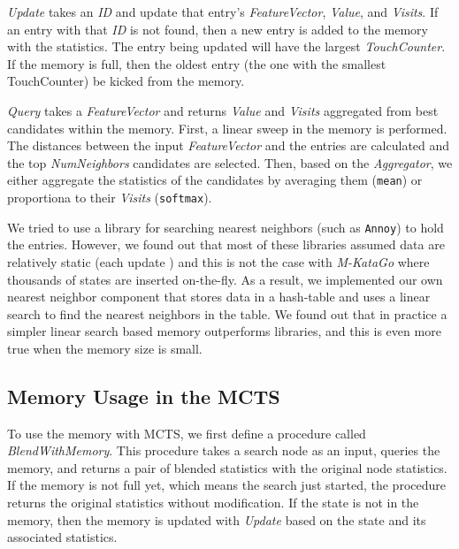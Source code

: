 \documentclass{article}
\newcommand{\mkatago}{\emph{M-KataGo}\xspace}
\begin{document}
      \textit{Update} takes an \textit{ID} and update that entry's \textit{FeatureVector}, \textit{Value}, and \textit{Visits}.
      If an entry with that \textit{ID} is not found, then a new entry is added to the memory with the statistics.
      The entry being updated will have the largest \textit{TouchCounter}.
      If the memory is full, then the oldest entry (the one with the smallest TouchCounter) be kicked from the memory.

      \textit{Query} takes a \textit{FeatureVector} and returns \textit{Value} and \textit{Visits} aggregated from best candidates within the memory.
      First, a linear sweep in the memory is performed.
      The distances between the input \textit{FeatureVector} and the entries are calculated and the top \textit{NumNeighbors} candidates are selected.
      Then, based on the \textit{Aggregator}, we either aggregate the statistics of the candidates by averaging them (\texttt{mean}) or proportiona to their \textit{Visits} (\texttt{softmax}).

      We tried to use a library for searching nearest neighbors (such as \texttt{Annoy}) to hold the entries.
      However, we found out that most of these libraries assumed data are relatively static (each update ) and this is not the case with \mkatago where thousands of states are inserted on-the-fly.
      As a result, we implemented our own nearest neighbor component that stores data in a hash-table and uses a linear search to find the nearest neighbors in the table.
      We found out that in practice a simpler linear search based memory outperforms libraries, and this is even more true when the memory size is small.

      \subsection{Memory Usage in the MCTS}
      To use the memory with MCTS, we first define a procedure called \textit{BlendWithMemory}.
      This procedure takes a search node as an input, queries the memory, and returns a pair of blended statistics with the original node statistics.
      If the memory is not full yet, which means the search just started, the procedure returns the original statistics without modification.
      If the state is not in the memory, then the memory is updated with \textit{Update} based on the state and its associated statistics.
\end{document}
